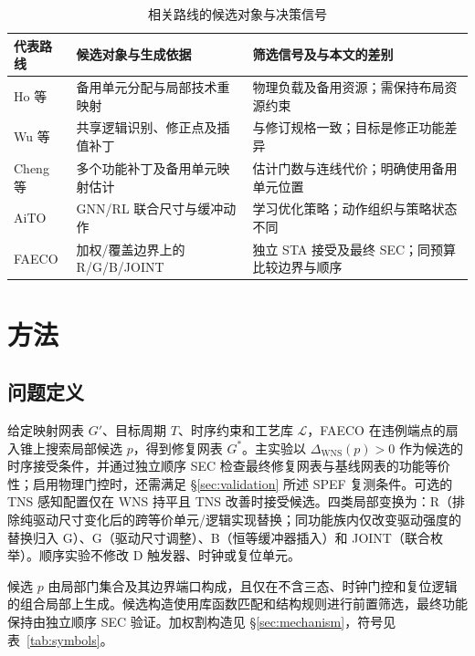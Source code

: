 \documentclass[twocolumn,10pt,fontset=windows]{ctexart}
\begin{document}
\begin{table}[ht]
\centering
\caption{相关路线的候选对象与决策信号}
\label{tab:baseline_cmp}
\footnotesize
\setlength{\tabcolsep}{2pt}
\begin{tabular}{>{\raggedright\arraybackslash}p{1.6cm}>{\raggedright\arraybackslash}p{2.7cm}>{\raggedright\arraybackslash}p{2.9cm}}
\toprule
\textbf{代表路线} & \textbf{候选对象与生成依据} & \textbf{筛选信号及与本文的差别} \\
\midrule
Ho 等\cite{ho2010eco} & 备用单元分配与局部技术重映射 & 物理负载及备用资源；需保持布局资源约束 \\
Wu 等\cite{jiang2010fraig} & 共享逻辑识别、修正点及插值补丁 & 与修订规格一致；目标是修正功能差异 \\
Cheng 等\cite{jiang2016resource} & 多个功能补丁及备用单元映射估计 & 估计门数与连线代价；明确使用备用单元位置 \\
AiTO\cite{chen2024aito} & GNN/RL 联合尺寸与缓冲动作 & 学习优化策略；动作组织与策略状态不同 \\
FAECO & 加权/覆盖边界上的 R/G/B/JOINT & 独立 STA 接受及最终 SEC；同预算比较边界与顺序 \\
\bottomrule
\end{tabular}
\end{table}


\section{方法}

\subsection{问题定义}
给定映射网表 $G'$、目标周期 $T$、时序约束和工艺库 $\mathcal{L}$，FAECO 在违例端点的扇入锥上搜索局部候选 $p$，得到修复网表 $G^*$。主实验以 $\Delta_{\mathrm{WNS}}(p)>0$ 作为候选的时序接受条件，并通过独立顺序 SEC 检查最终修复网表与基线网表的功能等价性；启用物理门控时，还需满足 \S\ref{sec:validation} 所述 SPEF 复测条件。可选的 TNS 感知配置仅在 WNS 持平且 TNS 改善时接受候选。四类局部变换为：R（排除纯驱动尺寸变化后的跨等价单元/逻辑实现替换；同功能族内仅改变驱动强度的替换归入 G）、G（驱动尺寸调整）、B（恒等缓冲器插入）和 JOINT（联合枚举）。顺序实验不修改 D 触发器、时钟或复位单元。

候选 $p$ 由局部门集合及其边界端口构成，且仅在不含三态、时钟门控和复位逻辑的组合局部上生成。候选构造使用库函数匹配和结构规则进行前置筛选，最终功能保持由独立顺序 SEC 验证。加权割构造见 \S\ref{sec:mechanism}，符号见表~\ref{tab:symbols}。
\end{document}

